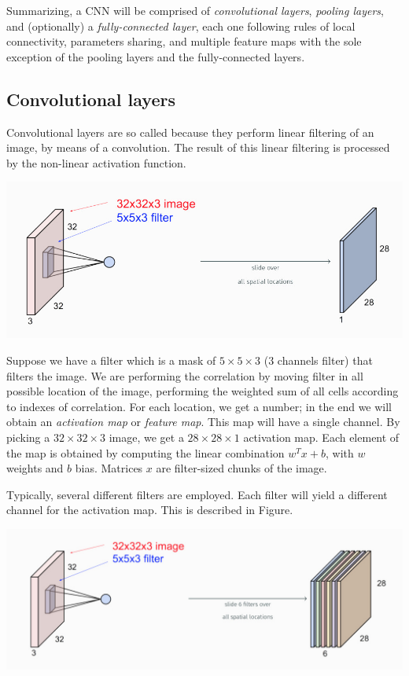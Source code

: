 \documentclass[10pt]{report}
\begin{document}
Summarizing, a CNN will be comprised of \emph{convolutional layers}, \emph{pooling
layers}, and (optionally) a \emph{fully-connected layer}, each one following
rules of local connectivity, parameters sharing, and multiple feature
maps with the sole exception of the pooling layers and the
fully-connected layers.

\subsection{Convolutional layers}
\label{convolutional-layers}
Convolutional layers are so called because they perform linear filtering
of an image, by means of a convolution. The result of this linear
filtering is processed by the non-linear activation function.

\begin{center}
\includegraphics[width=.9\linewidth]{./pics/cnn/conv-layers-1.jpg}
\end{center}

Suppose we have a filter which is a mask of \(5\times 5\times 3\) (\(3\)
channels filter) that filters the image. We are performing the
correlation by moving filter in all possible location of the image,
performing the weighted sum of all cells according to indexes of
correlation. For each location, we get a number; in the end we will
obtain an \emph{activation map} or \emph{feature map}. This map will have a single
channel. By picking a \(32 \times 32 \times 3\) image, we get a
\(28 \times 28 \times 1\) activation map. Each element of the map is
obtained by computing the linear combination \(w^T x + b\), with \(w\)
weights and \(b\) bias. Matrices \(x\) are filter-sized chunks of the
image.

Typically, several different filters are employed. Each filter will
yield a different channel for the activation map. This is described in
Figure.

\begin{center}
\includegraphics[width=.9\linewidth]{./pics/cnn/conv-layers-2.jpg}
\end{center}
\end{document}
